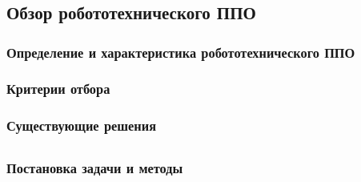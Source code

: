 \chapter{}
\section{Обзор робототехнического ППО}
	\subsection{Определение и характеристика робототехнического ППО}
	\label{title:chapter1:robo_middleware_definition}
	
	\subsection{Критерии отбора}
	
	\label{title:chapter1:mars_criterias}
	\subsection{Существующие решения}
	
	\label{title:chapter1:mars_solutions}
\section{}
	\subsection{Постановка задачи и методы}
	\label{title:chapter1:performance_testing_approaches}
	
	\subsection{}
		\subsubsection{}
		\label{title:chapter1:performance_testing_criterias}
		
		\subsubsection{}
		\label{title:chapter1:performance_testing_benchmarks_review}
		
\section{}